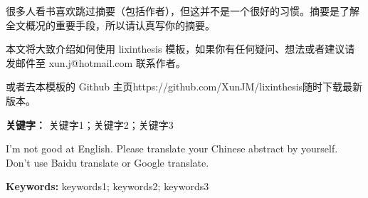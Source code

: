 \thispagestyle{empty}
\begin{cnabstract}
	很多人看书喜欢跳过摘要（包括作者），但这并不是一个很好的习惯。摘要是了解全文概况的重要手段，所以请认真写你的摘要。
	
	本文将大致介绍如何使用 lixinthesis 模板，如果你有任何疑问、想法或者建议请发邮件至 {\sf xun.j@hotmail.com} 联系作者。
	
	或者去本模板的 Github 主页{\sf https://github.com/XunJM/lixinthesis}随时下载最新版本。
	
	\noindent	
	\textbf{关键字：} 关键字1；关键字2；关键字3
\end{cnabstract}
\clearpage %
\thispagestyle{empty}
\begin{enabstract}\sf
	I'm not good at English. Please translate your Chinese abstract by yourself. Don't use Baidu translate or Google translate.
	
	\noindent
	\textbf{Keywords:} keywords1; keywords2; keywords3

\end{enabstract}